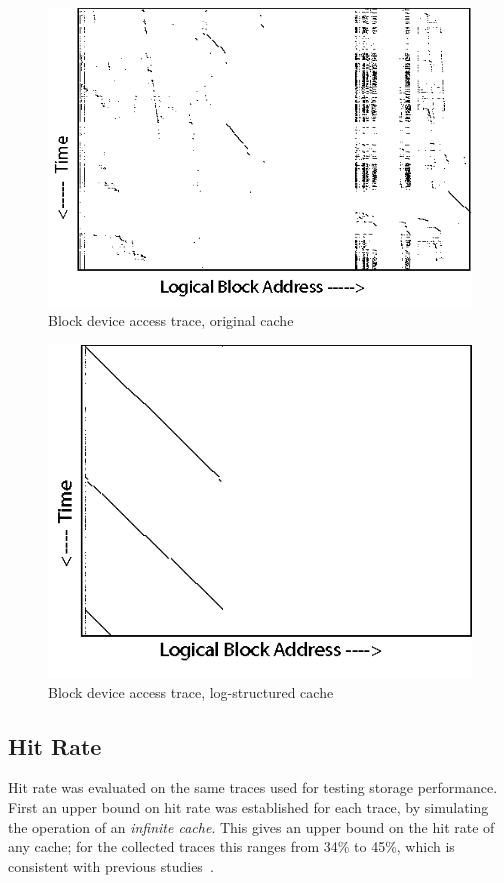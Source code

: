 \documentclass[letterpaper,twocolumn,10pt]{article}
\begin{document}
\begin{figure}[t]
\centering
\includegraphics[width=0.8\columnwidth]{graphs/disk.png}
\caption{Block device access trace, original cache}
\label{fig:blktrace:disk}
\end{figure}

\begin{figure}
\centering
\includegraphics[width=0.717\columnwidth]{graphs/flash.png}
\caption{Block device access trace, log-structured cache}
\label{fig:blktrace:flash}
\end{figure}

\subsection{Hit Rate}

Hit rate was evaluated on the same traces used for testing storage
performance. First an upper bound on hit rate was established for each trace, by
simulating the operation of an \emph{infinite cache}. 
This gives an upper bound on the hit rate of any cache; for the collected traces
this ranges from 34\% to 45\%, which is consistent with previous
studies~\cite{souders12}. 
\end{document}
